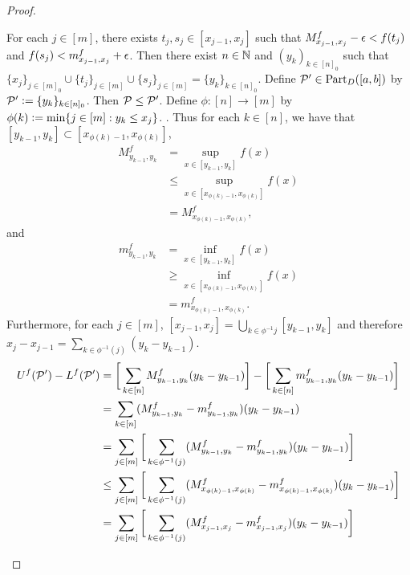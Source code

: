\documentclass{book}
\begin{document}
\begin{proof}
\begin{enumerate}
\begin{itemize}
				For each $j \in [m]$, there exists $t_j,s_j \in [x_{j-1}, x_j]$ such that $M^f_{x_{j-1}, x_j} -\epsilon < f(t_j)$ and $f(s_j) < m^f_{x_{j-1}, x_j} + \epsilon$. Then there exist $n \in \mathbb{N}$ and $(y_k)_{k \in [n]_0}$ such that $\{x_j\}_{j \in [m]_0} \cup \{t_j\}_{j \in [m]} \cup \{s_j\}_{j \in [m]} = \{y_k\}_{k \in [n]_0}$. Define $\mathcal{P}' \in \text{Part}_D([a,b])$ by $\mathcal{P}' \vcentcolon= \{y_k\}_{k \in [n]_0}$. Then $\mathcal{P} \leq \mathcal{P}'$. Define $\phi:[n] \rightarrow [m]$ by $\phi(k) \vcentcolon= \min \{j \in [m]: y_k \leq x_j\}$. . Thus for each $k \in [n]$, we have that $[y_{k-1}, y_k] \subset [x_{\phi(k) -1}, x_{\phi(k)}]$,
				\begin{align*}
					M^f_{y_{k-1}, y_k}
					& = \sup\limits_{x \in [y_{k-1}, y_k]} f(x) \\
					& \leq \sup\limits_{x \in [x_{\phi(k) -1}, x_{\phi(k)}]} f(x) \\
					& = M^f_{x_{\phi(k) -1}, x_{\phi(k)}},
				\end{align*}
				and 
				\begin{align*}
					m^f_{y_{k-1}, y_k}
					& = \inf\limits_{x \in [y_{k-1}, y_k]} f(x) \\
					& \geq \inf\limits_{x \in [x_{\phi(k) -1}, x_{\phi(k)}]} f(x) \\
					& = m^f_{x_{\phi(k) -1}, x_{\phi(k)}}.
				\end{align*}
				Furthermore, for each $j \in [m]$, $[x_{j-1}, x_j] = \bigcup\limits_{k \in \phi^{-1}j} [y_{k - 1}, y_k]$ and therefore $x_j - x_{j-1} = \sum\limits_{k \in \phi^{-1}(j)} (y_k - y_{k-1})$. 
				\begin{align*}
					U^f(\MP') - L^f(\MP')
					& = \bigg[ \sum\limits_{k \in [n]} M^f_{y_{k-1}, y_k} (y_k - y_{k-1}) \bigg] - \bigg[ \sum\limits_{k \in [n]} m^f_{y_{k-1}, y_k} (y_k - y_{k-1}) \bigg] \\
					& = \sum\limits_{k \in [n]} (M^f_{y_{k-1}, y_k} - m^f_{y_{k-1}, y_k}) (y_k - y_{k-1}) \\
					& = \sum\limits_{j \in [m]} \bigg[ \sum\limits_{k \in \phi^{-1}(j)} (M^f_{y_{k-1}, y_k} - m^f_{y_{k-1}, y_k}) (y_k - y_{k-1}) \bigg] \\
					& \leq \sum\limits_{j \in [m]} \bigg[ \sum\limits_{k \in \phi^{-1}(j)} (M^f_{x_{\phi(k) -1}, x_{\phi(k)}} - m^f_{x_{\phi(k) -1}, x_{\phi(k)}}) (y_k - y_{k-1}) \bigg] \\
					& = \sum\limits_{j \in [m]} \bigg[ \sum\limits_{k \in \phi^{-1}(j)} (M^f_{x_{j -1}, x_{j}} - m^f_{x_{j -1}, x_{j}}) (y_k - y_{k-1}) \bigg] \\

\end{align*}
\end{itemize}
\end{enumerate}
\end{proof}
\end{document}
